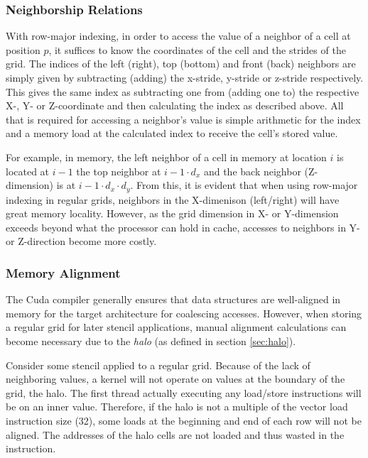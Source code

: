 \subsubsection{Neighborship Relations}

With row-major indexing, in order to access the value of a neighbor of a cell at position $p$, it suffices to know the coordinates of the cell and the strides of the grid. The indices of the left (right), top (bottom) and front (back) neighbors are simply given by subtracting (adding) the x-stride, y-stride or z-stride respectively. This gives the same index as subtracting one from (adding one to) the respective X-, Y- or Z-coordinate and then calculating the index as described above. All that is required for accessing a neighbor's value is simple arithmetic for the index and a memory load at the calculated index to receive the cell's stored value.

For example, in memory, the left neighbor of a cell in memory at location $i$ is located at $i-1$ the top neighbor at $i-1\cdot d_x$ and the back neighbor (Z-dimension) is at $i-1\cdot d_x\cdot d_y$. From this, it is evident that when using row-major indexing in regular grids, neighbors in the X-dimenison (left/right) will have great memory locality. However, as the grid dimension in X- or Y-dimension exceeds beyond what the processor can hold in cache, accesses to neighbors in Y- or Z-direction become more costly. 

\subsubsection{Memory Alignment}

\label{sec:regular-memory-alignment}
The Cuda compiler generally ensures that data structures are well-aligned in memory for the target architecture for coalescing accesses. However, when storing a regular grid for later stencil applications, manual alignment calculations can become necessary due to the \emph{halo} (as defined in section \ref{sec:halo}). 

Consider some stencil applied to a regular grid. Because of the lack of neighboring values, a kernel will not operate on values at the boundary of the grid, the halo. The first thread actually executing any load/store instructions will be on an inner value. Therefore, if the halo is not a multiple of the vector load instruction size (32), some loads at the beginning and end of each row will not be aligned. The addresses of the halo cells are not loaded and thus wasted in the instruction.

